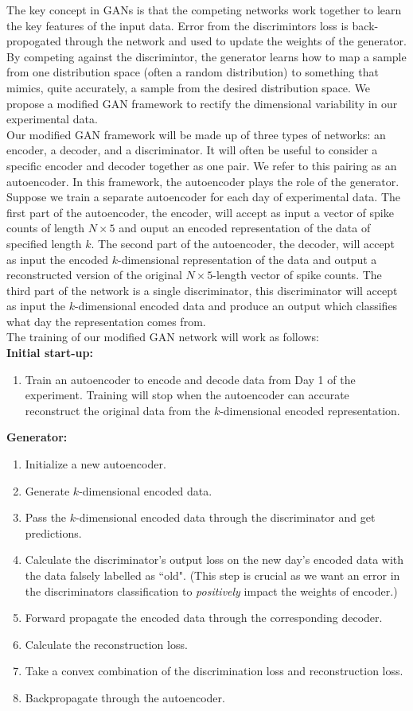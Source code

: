 \documentclass[12pt]{article}
\begin{document}
\indent The key concept in GANs is that the competing networks work together to learn the key features of the input data. Error from the discrimintors loss is back-propogated through the network and used to update the weights of the generator. By competing against the discrimintor, the generator learns how to map a sample from one distribution space (often a random distribution) to something that mimics, quite accurately, a sample from the desired distribution space. We propose a modified GAN framework to rectify the dimensional variability in our experimental data. \\
\indent Our modified GAN framework will be made up of three types of networks: an encoder, a decoder, and a discriminator. It will often be useful to consider a specific encoder and decoder together as one pair. We refer to this pairing as an autoencoder. In this framework, the autoencoder plays the role of the generator. Suppose we train a separate autoencoder for each day of experimental data. The first part of the autoencoder, the encoder, will accept as input a vector of spike counts of length $N\times 5$ and ouput an encoded representation of the data of specified length $k$. The second part of the autoencoder, the decoder, will accept as input the encoded $k$-dimensional representation of the data and output a reconstructed version of the original $N\times 5$-length vector of spike counts. The third part of the network is a single discriminator, this discriminator will accept as input the $k$-dimensional encoded data and produce an output which classifies what day the representation comes from. \\
\indent The training of our modified GAN network will work as follows: \\
\textbf{Initial start-up:}
\begin{enumerate}
  \item Train an autoencoder to encode and decode data from Day 1 of the experiment. Training will stop when the autoencoder can accurate reconstruct the original data from the $k$-dimensional encoded representation.
\end{enumerate}
\textbf{Generator:}
\begin{enumerate}
  \item Initialize a new autoencoder.
  \item Generate $k$-dimensional encoded data.
  \item Pass the $k$-dimensional encoded data through the discriminator and get predictions.
  \item Calculate the discriminator's output loss on the new day's encoded data with the data falsely labelled as ``old". (This step is crucial as we want an error in the discriminators classification to \textit{positively} impact the weights of encoder.)
  \item Forward propagate the encoded data through the corresponding decoder.
  \item Calculate the reconstruction loss.
  \item Take a convex combination of the discrimination loss and reconstruction loss.
  \item Backpropagate through the autoencoder.
  \end{enumerate}
\end{document}
